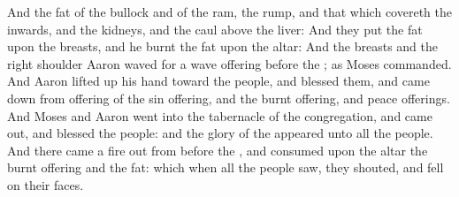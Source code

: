 \begin{biblechapter}
\verse And the fat of the bullock and of the ram, the rump, and that which covereth the inwards, and the kidneys, and the caul above the liver:
\verse And they put the fat upon the breasts, and he burnt the fat upon the altar:
\verse And the breasts and the right shoulder Aaron waved for a wave offering before the \LORD; as Moses commanded.
\verse And Aaron lifted up his hand toward the people, and blessed them, and came down from offering of the sin offering, and the burnt offering, and peace offerings.
\verse And Moses and Aaron went into the tabernacle of the congregation, and came out, and blessed the people: and the glory of the \LORD appeared unto all the people.
\verse And there came a fire out from before the \LORD, and consumed upon the altar the burnt offering and the fat: which when all the people saw, they shouted, and fell on their faces.
\end{biblechapter}

